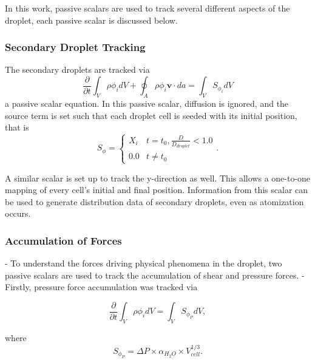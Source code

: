 \documentclass{UCF_ETD}
\begin{document}
In this work, passive scalars are used to track several different aspects of the droplet, each passive scalar is discussed below.
\subsubsection{Secondary Droplet Tracking}
\label{sec:secondDropTrack}

The secondary droplets are tracked via 
\begin{equation}
    \frac{\partial}{\partial t} \int_{V} \rho \phi_{i}dV + \oint_{A} \rho \phi_{i} \textbf{v} \cdot da = \int_{V} S_{\phi_{i}}dV
    \label{eq:secondDropPassiveScalar}
\end{equation}
a passive scalar equation. In this passive scalar, diffusion is ignored, and the source term is set such that each droplet cell is seeded with its initial position, that is 
\begin{equation}
    S_{\phi} = \begin{cases}
        X_{i} & t = t_{0}, \frac{D}{D_{droplet}} < 1.0 \\
        0.0 & t \neq t_{0} 
    \end{cases}.
    \label{eq:diffusionSource}
\end{equation}

A similar scalar is set up to track the y-direction as well. This allows a one-to-one mapping of every cell's initial and final position. Information from this scalar can be used to generate distribution data of secondary droplets, even as atomization occurs.



\subsubsection{Accumulation of Forces}
\label{sec:force_accum}
- To understand the forces driving physical phenomena in the droplet, two passive scalars are used to track the accumulation of shear and pressure forces.
- Firstly, pressure force accumulation was tracked via

\begin{equation}
    \frac{\partial}{\partial t} \int_{V} \rho \phi_{i}dV = \int_{V} S_{\phi_{P}}dV,
    \label{eq:pressureScalar}
\end{equation}

\noindent where 
\begin{equation}
    S_{\phi_{P}} = \Delta P \times \alpha_{H_{2}O}\times V_{cell}^{1/3}.
    \label{eq:pressureSource}
\end{equation}
\end{document}
